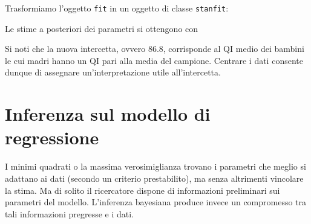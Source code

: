 \documentclass[
  10pt,
  italian,
  a4paper,
  extrafontsizes,onecolumn,openright
  ]{memoir}
\newenvironment{Shaded}{\begin{snugshade}}{\end{snugshade}}
\newcommand{\CommentTok}[1]{\textcolor[rgb]{0.56,0.35,0.01}{\textit{#1}}}
\newcommand{\FunctionTok}[1]{\textcolor[rgb]{0.00,0.00,0.00}{#1}}
\newcommand{\NormalTok}[1]{#1}
\newcommand{\OtherTok}[1]{\textcolor[rgb]{0.56,0.35,0.01}{#1}}
\newcommand{\SpecialCharTok}[1]{\textcolor[rgb]{0.00,0.00,0.00}{#1}}
\newcommand{\StringTok}[1]{\textcolor[rgb]{0.31,0.60,0.02}{#1}}
\begin{document}
\noindent
Trasformiamo l'oggetto \texttt{fit} in un oggetto di classe \texttt{stanfit}:

\begin{Shaded}
\end{Shaded}

\noindent
Le stime a posteriori dei parametri si ottengono con

\begin{Shaded}
\end{Shaded}

\noindent
Si noti che la nuova intercetta, ovvero 86.8, corrisponde al QI medio dei bambini le cui madri hanno un QI pari alla media del campione. Centrare i dati consente dunque di assegnare un'interpretazione utile all'intercetta.

\hypertarget{inference-reg-lin-stan}{%
\chapter{Inferenza sul modello di regressione}\label{inference-reg-lin-stan}}

I minimi quadrati o la massima verosimiglianza trovano i parametri che meglio si adattano ai dati (secondo un criterio prestabilito), ma senza altrimenti vincolare la stima. Ma di solito il ricercatore dispone di informazioni preliminari sui parametri del modello. L'inferenza bayesiana produce invece un compromesso tra tali informazioni pregresse e i dati.
\end{document}
